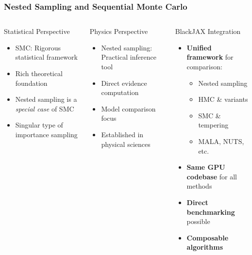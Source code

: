 \documentclass[aspectratio=169]{beamer}
\begin{document}
\begin{frame}
    \frametitle{Nested Sampling and Sequential Monte Carlo}
    \begin{columns}
        \begin{block}{Statistical Perspective}
            \begin{itemize}
                \item SMC: Rigorous statistical framework
                \item Rich theoretical foundation
                \item Nested sampling is a \emph{special case} of SMC
                \item Singular type of importance sampling
            \end{itemize}
        \end{block}
        \begin{block}{Physics Perspective}
            \begin{itemize}
                \item Nested sampling: Practical inference tool
                \item Direct evidence computation
                \item Model comparison focus
                \item Established in physical sciences
            \end{itemize}
        \end{block}
        \begin{block}{BlackJAX Integration}
            \begin{itemize}
                \item \textbf{Unified framework} for comparison:
                    \begin{itemize}
                        \item Nested sampling
                        \item HMC \& variants
                        \item SMC \& tempering
                        \item MALA, NUTS, etc.
                    \end{itemize}
                \item \textbf{Same GPU codebase} for all methods
                \item \textbf{Direct benchmarking} possible
                \item \textbf{Composable algorithms}

\end{itemize}
\end{block}
\end{columns}
\end{frame}
\end{document}
